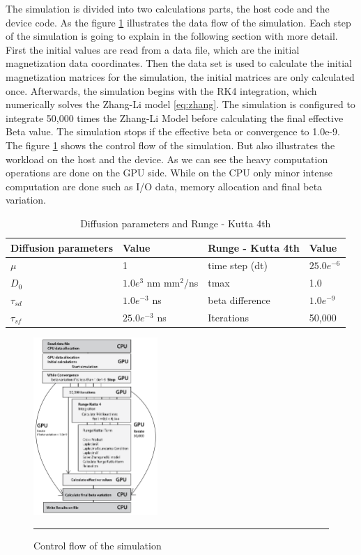The simulation is divided into two calculations parts, the host code and the device code. As the figure \ref{fig:flow} illustrates the data flow of the simulation. Each step of the simulation is going to explain in the following section with more detail. First the initial values are read from a data file, which are the initial magnetization data coordinates. Then the data set is used to calculate the initial magnetization matrices for the simulation, the initial matrices are only calculated once. Afterwards, the simulation begins with the RK4 integration, which numerically solves the  Zhang-Li model \ref{eq:zhang}. The simulation is configured to integrate 50,000 times the Zhang-Li Model before calculating the final effective Beta value. The simulation stops if the effective beta or convergence to 1.0e-9. The figure \ref{fig:flow} shows the control flow of the simulation. But also illustrates the workload on the host and the device. As we can see the heavy computation operations are done on the GPU side. While on the CPU only minor intense computation are done such as I/O data, memory allocation and final beta variation.

\begin{table}[h]
\centering
\begin{tabular}{| l | l | l | l |}
\hline
Diffusion parameters& Value & Runge - Kutta 4th & Value \\
\hline 
$\mu$ & 1 &  time step (dt) &   $25.0e^{-6}$   \\
\hline
$D_{0}$ & $1.0e^{3}$ nm mm$^2$/ns  & tmax  & 1.0  \\
\hline
$\tau_{sd}$ & $1.0e^{-3}$ ns  & beta difference & $1.0e^{-9}$ \\
\hline
$\tau_{sf}$ & $25.0e^{-3}$ ns  & Iterations & 50,000 \\
\hline
\end{tabular}
\caption{Diffusion parameters and Runge - Kutta 4th}
\label{tab:drk}
\end{table}

\begin{figure}[htbp]
	\centering
		\includegraphics[width=0.42\textwidth]{Figures/flow.png}
		\rule{35em}{0.2pt}
	\caption[Control flow]{Control flow of the simulation}
	\label{fig:flow}
\end{figure}

